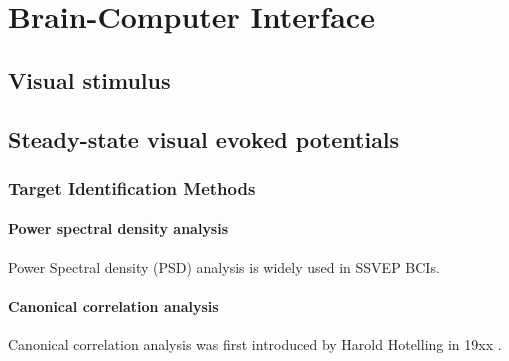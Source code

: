 
\chapter{Brain-Computer Interface}
\section{Visual stimulus}
\section{Steady-state visual evoked potentials}
\subsection{Target Identification Methods}
\subsubsection{Power spectral density analysis}
Power Spectral density (PSD) analysis is widely used in SSVEP BCIs\cite{bin2009cca}.
\subsubsection{Canonical correlation analysis}
Canonical correlation analysis was first introduced by Harold Hotelling in 19xx .